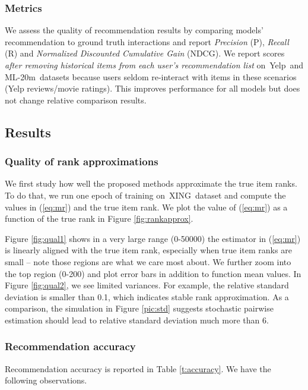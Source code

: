 \documentclass[letterpaper]{article} %
\newcommand{\xing}{\textsf{XING}}
\newcommand{\yelp}{\textsf{Yelp}}
\newcommand{\movietwenty}{\textsf{ML-20m}}
\begin{document}
\subsubsection{Metrics}
We assess the quality of recommendation results by comparing models' recommendation to ground truth interactions and report \textit{Precision} (P), \textit{Recall} (R) and \textit{Normalized Discounted Cumulative Gain} (NDCG). We report scores \textit{after removing historical items from each user's recommendation list} on~\yelp~and \movietwenty~datasets because users seldom re-interact with items in these scenarios (Yelp reviews/movie ratings). This improves performance for all models but does not change relative comparison results.

\subsection{Results}

\subsubsection{Quality of rank approximations}
We first study how well the proposed methods approximate the true item ranks. To do that, we run one epoch of training on~\xing~dataset and compute the values in (\ref{eq:mr}) and the true item rank. We plot the value of (\ref{eq:mr}) as a function of the true rank in Figure \ref{fig:rankapprox}.

Figure \ref{fig:qual1} shows in a very large range (0-50000) the estimator in (\ref{eq:mr}) is linearly aligned with the true item rank, especially when true item ranks are small -- note those regions are what we care most about. We further zoom into the top region (0-200) and plot error bars in addition to function mean values. In Figure \ref{fig:qual2}, we see limited variances. For example, the relative standard deviation is smaller than 0.1, which indicates stable rank approximation. As a comparison, the simulation in Figure \ref{pic:std} suggests stochastic pairwise estimation should lead to relative standard deviation much more than 6.

\subsubsection{Recommendation accuracy}

Recommendation accuracy is reported in Table \ref{t:accuracy}. We have the following observations.
\end{document}
